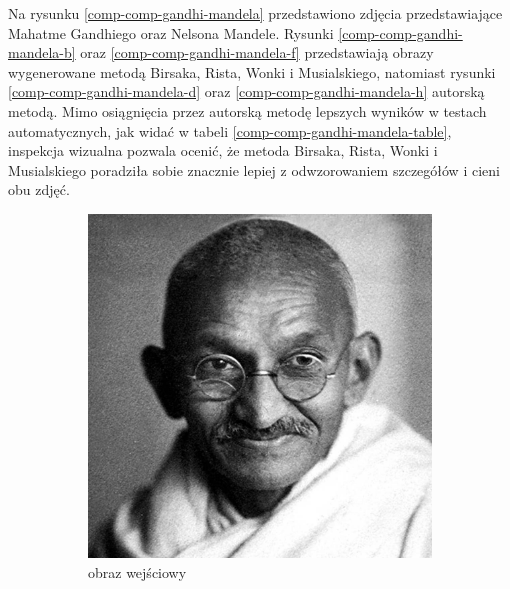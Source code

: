 \documentclass[a4paper, 12pt, polish, twoside]{extreport}
\begin{document}
	Na rysunku \ref{comp-comp-gandhi-mandela} przedstawiono zdjęcia przedstawiające Mahatme Gandhiego oraz Nelsona Mandele. Rysunki \ref{comp-comp-gandhi-mandela-b} oraz \ref{comp-comp-gandhi-mandela-f} przedstawiają obrazy wygenerowane metodą Birsaka, Rista, Wonki i Musialskiego, natomiast rysunki \ref{comp-comp-gandhi-mandela-d} oraz \ref{comp-comp-gandhi-mandela-h} autorską metodą. Mimo osiągnięcia przez autorską metodę lepszych wyników w testach automatycznych, jak widać w tabeli \ref{comp-comp-gandhi-mandela-table}, inspekcja wizualna pozwala ocenić, że metoda Birsaka, Rista, Wonki i Musialskiego poradziła sobie znacznie lepiej z odwzorowaniem szczegółów i cieni obu zdjęć. 
	\begin{figure}[H] 
    \centering
    \begin{subfigure}{0.24\textwidth}
        \centering
        \includegraphics[width = \textwidth]{img/6-comp/gandhi_original_c10_inv0.png}
        \caption{obraz wejściowy}
        \label{comp-comp-gandhi-mandela-a}
    \end{subfigure}
    \begin{subfigure}{0.24\textwidth}
        \centering

\end{subfigure}
\end{figure}
\end{document}
